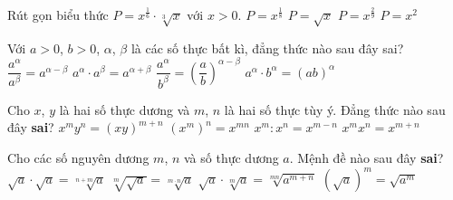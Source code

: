 \begin{ex}%
	Rút gọn biểu thức $P=x^{\tfrac{1}{6}} \cdot \sqrt[{3}]{x}$  với $x > 0$.
	 \choice
		 {$P=x^{\tfrac{1}{8}}$}
		{\True $P=\sqrt{x}$} 
		{$P=x^{\tfrac{2}{9}}$} 
		{$P=x^2$} 
\end{ex}

\begin{ex}%
	Với $a>0$, $b>0$, $\alpha$, $\beta $ là các  số thực bất kì, đẳng thức nào sau đây sai?
	\choice 
		 {$\dfrac{a^{\alpha }}{a^{\beta }}=a^{\alpha -\beta }$}
		{$a^{\alpha }\cdot a^{\beta  }=a^{\alpha +\beta }$}
		{\True $\dfrac{a^{\alpha }}{b^{\beta }}={\left( \dfrac{a}{b} \right)}^{\alpha  -\beta }$}
		{$a^{\alpha }\cdot{b^{\alpha }}=\left( ab \right)^{\alpha  }$}
\end{ex}

\begin{ex}%
	Cho $x$, $y$ là hai  số thực dương và $m$, $n$ là hai số thực tùy ý. Đẳng thức nào sau đây \textbf{sai}?
	 \choice
		{\True  $x^my^n=(xy)^{m+n}$}
		{$\left(x^m\right)^n=x^{mn}$} 
		{$x^m:x^n=x^{m-n}$} 
		 {$x^mx^n=x^{m+n}$}
\end{ex}

\begin{ex}%
	Cho các số nguyên dương $m$, $n$ và số thực dương $a$. Mệnh đề nào  sau đây \textbf{sai}?
	\choice 
		{\True $\sqrt{a}  \cdot \sqrt{a}=\sqrt[n+m]{a}$}
		{$\sqrt[m]{\sqrt{a}}=\sqrt[m \cdot  n]{a}$}
		{$\sqrt{a} \cdot \sqrt[m]{a}=\sqrt[m  n]{a^{m+n}}$}
		 {$(\sqrt{a})^m=\sqrt{a^m}$}
\end{ex}

